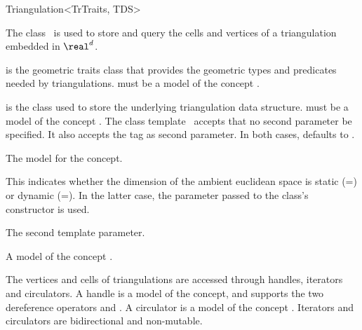 \begin{ccRefClass}{Triangulation<TrTraits, TDS>}

\ccDefinition

The class \ccRefName\ is used to store and query the cells and vertices of
a triangulation embedded in $\real^d$.


\ccParameters

 is the geometric traits class that provides the geometric types
and predicates needed by triangulations.  must be a model of the
concept .

 is the class used to store the underlying triangulation data
structure.  must be a model of the concept
. The class template \ccRefName\ accepts that no
second parameter be specified. It also accepts the tag  as
second parameter. In both cases,  defaults to
.

\ccTypes


%
{The model for the  concept.}


%
{This indicates whether the dimension of the ambient euclidean space is static
(=\ccGlobalScope{}) or
dynamic (=\ccGlobalScope{}).
In the latter case, the  parameter passed to the class's constructor
is used.}

%
{The second template parameter.}

\ccGlue
{}
\ccGlue
{}
\ccGlue
{}%
{A model of the concept .}

The vertices and cells of triangulations are accessed through handles,
iterators and circulators. A handle is a model of the  concept,
and supports the two dereference operators  and
. A circulator is a model of the concept .
Iterators and circulators are bidirectional and non-mutable.


\end{ccRefClass}
